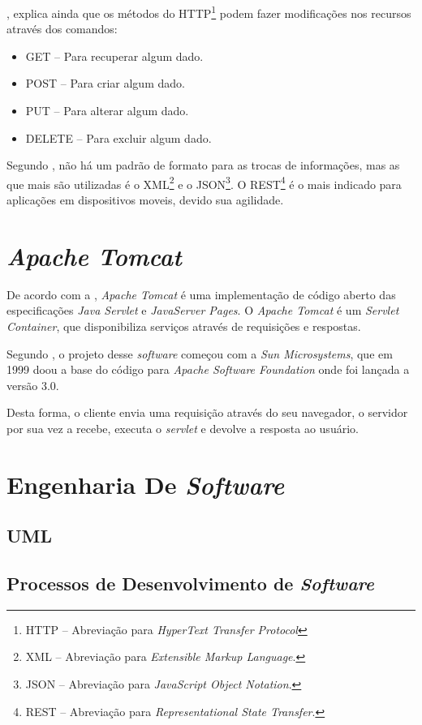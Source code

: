 	\par {}, explica ainda que os métodos do HTTP\footnote{
 HTTP – Abreviação para \textit{HyperText Transfer Protocol}} podem fazer
 modificações nos recursos através dos comandos:
	 
	 \begin{itemize}
	   \item GET – Para recuperar algum dado. 
	   \item POST – Para criar algum dado.
	   \item PUT – Para alterar algum dado. 
	   \item DELETE – Para excluir algum dado. 
	 \end{itemize}
	 
	\par Segundo , não há um padrão de formato para as
 trocas de informações, mas as que mais são utilizadas é o XML\footnote{XML –
 Abreviação para \textit{Extensible Markup Language}.} e o JSON\footnote{JSON –
 Abreviação para \textit{JavaScript Object Notation}.}. O REST\footnote{REST –
 Abreviação para \textit{Representational State Transfer}.} é o mais indicado
 para aplicações em dispositivos moveis, devido sua agilidade.
	
	
\section{\textit{Apache Tomcat}}

	\par De acordo com a , \textit{Apache Tomcat} é uma
implementação de código aberto das especificações \textit{Java Servlet} e
\textit{JavaServer Pages}. O \textit{Apache Tomcat}  é um \textit{Servlet
Container}, que disponibiliza serviços através de requisições e respostas.
	
	\par Segundo , o projeto desse \textit{software} começou
com a \textit{Sun Microsystems}, que em 1999 doou a base do código para
\textit{Apache Software Foundation} onde foi lançada a versão 3.0.
	
	\par Desta forma, o cliente envia uma requisição através do seu navegador, o
servidor por sua vez a recebe, executa o \textit{servlet} e devolve a resposta
ao usuário.

\section{Engenharia De \textit{Software}}

	\par 
	
	\subsection{UML}
		
		\par 
	
	\subsection{Processos de Desenvolvimento de \textit{Software}}
	